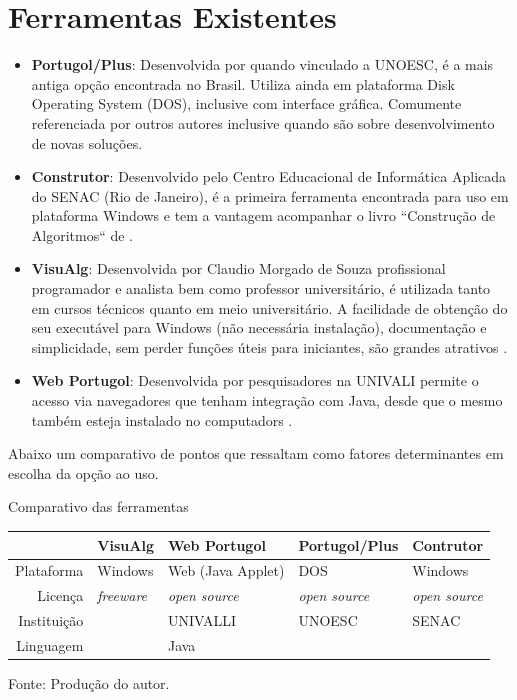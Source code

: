 \section{Ferramentas Existentes}

\begin{itemize}

\item \textbf{Portugol/Plus}: Desenvolvida por  quando vinculado a UNOESC, é a mais antiga opção encontrada no Brasil. Utiliza ainda em plataforma Disk Operating System (DOS), inclusive com interface gráfica. Comumente referenciada por outros autores inclusive quando são sobre desenvolvimento de novas soluções.

\item \textbf{Construtor}: Desenvolvido pelo Centro Educacional de Informática Aplicada do SENAC (Rio de Janeiro), é a primeira ferramenta encontrada para uso em plataforma Windows e tem a vantagem acompanhar o livro ``Construção de Algoritmos`` de .

\item \textbf{VisuAlg}: Desenvolvida por Claudio Morgado de Souza profissional programador e analista bem como professor universitário, é utilizada tanto em cursos técnicos quanto em meio universitário. A facilidade de obtenção do seu executável para Windows (não necessária instalação), documentação e simplicidade, sem perder funções úteis para iniciantes, são grandes atrativos \cite{souza2013etal}.

\item \textbf{Web Portugol}: Desenvolvida por pesquisadores na UNIVALI permite o acesso via navegadores que tenham integração com Java, desde que o mesmo também esteja instalado no computadors \cite{souza2013etal}.

\end{itemize}

Abaixo um comparativo de pontos que ressaltam como fatores determinantes em escolha da opção ao uso.

\begin{quadro}[h]
\centering
  \caption{Comparativo das ferramentas}\label{qua:compare-tools}
\begin{tabular}{| r | l | l | l | l |}\hline
& VisuAlg & Web Portugol & Portugol/Plus & Contrutor \\ \hline
Plataforma & Windows & Web (Java Applet) & DOS & Windows \\ \hline
Licença & \textit{freeware} & \textit{open source} & \textit{open source} & \textit{open source} \\ \hline
Instituição &  & UNIVALLI & UNOESC & SENAC \\ \hline
Linguagem &  & Java &  &  \\ \hline
\end{tabular}
  \caption*{\ifdraft{\color{green}}{}\footnotesize Fonte: Produção do autor.}
\end{quadro}

